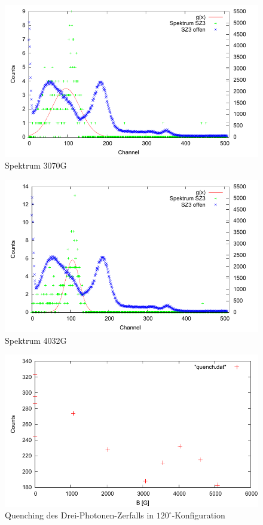 \begin{figure}
 \includegraphics[width=\textwidth]{Graphen/quench/spektrum_3070.pdf}
 \caption{Spektrum 3070G}
\end{figure}

\begin{figure}
 \includegraphics[width=\textwidth]{Graphen/quench/spektrum_4032.pdf}
 \caption{Spektrum 4032G}
\end{figure}

\begin{figure}
 \includegraphics[width=\textwidth]{Auswertung/quench.pdf}
 \caption{Quenching des Drei-Photonen-Zerfalls in $120^\circ$-Konfiguration}
\end{figure}

